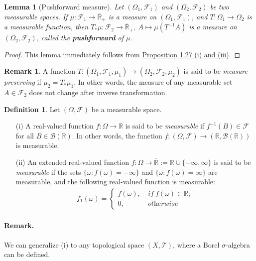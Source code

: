 \documentclass{article}
\numberwithin{equation}{section}
\theoremstyle{plain}
\newtheorem{lemma}[theorem]{Lemma}
\theoremstyle{definition}
\newtheorem{definition}[theorem]{Definition}
\newtheorem*{remark}{Remark}
\begin{document}
\begin{lemma}[Pushforward measure]\label{lemma:1.29} Let $(\Omega_1,\mathscr{F}_1)$ and $(\Omega_2,\mathscr{F}_2)$ be two measurable spaces. If $\mu:\mathscr{F}_1\to\overline{\mathbb{R}}_+$ is a measure on $(\Omega_1,\mathscr{F}_1)$, and $T:\Omega_1\to\Omega_2$ is a measurable function, then $T_*\mu:\mathscr{F}_2\to\overline{\mathbb{R}}_+,\ A\mapsto \mu(T^{-1}A)$ is a measure on $(\Omega_2,\mathscr{F}_2)$, called the \textbf{pushforward} of $\mu$.
\end{lemma}
\begin{proof}
This lemma immediately follows from \hyperref[prop:1.27]{Proposition 1.27 (i) and (iii)}.
\end{proof}
\begin{remark}
A function $T:(\Omega_1,\mathscr{F}_1,\mu_1)\to(\Omega_2,\mathscr{F}_2,\mu_2)$ is said to be \textit{measure preserving} if $\mu_2=T_*\mu_1$. In other words, the measure of any measurable set $A\in\mathscr{F}_2$ does not change after inverse transformation.
\end{remark}

\newpage
\begin{definition}\label{def:1.30} Let $(\Omega,\mathscr{F})$ be a measurable space.
\begin{itemize}
	\item[(i)] A real-valued function $f:\Omega\to\mathbb{R}$ is said to be \textit{measurable} if $f^{-1}(B)\in\mathscr{F}$ for all $B\in\mathscr{B}(\mathbb{R})$. In other words, the function $f:(\Omega,\mathscr{F})\to(\mathbb{R},\mathscr{B}(\mathbb{R}))$ is measurable.
	\item[(ii)] An extended real-valued function $f:\Omega\to\overline{\mathbb{R}}:=\mathbb{R}\cup\{-\infty,\infty\}$ is said to be \textit{measurable} if the sets $\{\omega:f(\omega)=-\infty\}$ and $\{\omega:f(\omega)=\infty\}$ are measurable, and the following real-valued function is measurable:
	\begin{align*}
		f_1(\omega)=\begin{cases}
			f(\omega),\ &\textit{if}\ f(\omega)\in\mathbb{R};\\
			0,\ &\textit{otherwise}
		\end{cases}
	\end{align*}
\end{itemize}
\end{definition}
\paragraph{Remark.} We can generalize (i) to any topological space $(X,\mathscr{T})$, where a Borel $\sigma$-algebra can be defined.
\end{document}
